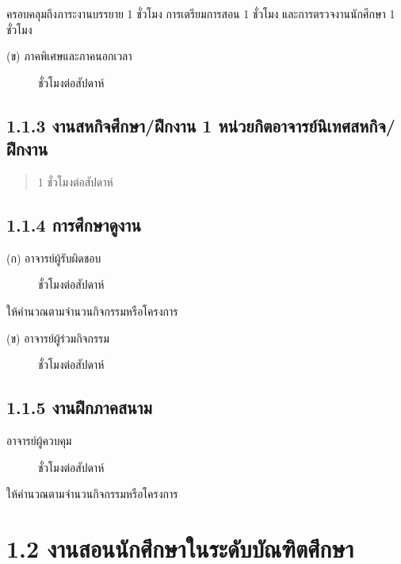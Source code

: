\documentclass[a4paper,12pt,english]{sphinxmanual}
\begin{document}
ครอบคลุมถึงภาระงานบรรยาย 1 ชั่วโมง การเตรียมการสอน 1 ชั่วโมง และการตรวจงานนักศึกษา 1 ชั่วโมง
\begin{description}
\item[{(ข) ภาคพิเศษและภาคนอกเวลา}]  ชั่วโมงต่อสัปดาห์

\end{description}


\subsection{1.1.3 งานสหกิจศึกษา/ฝึกงาน 1 หน่วยกิตอาจารย์นิเทศสหกิจ/ฝึกงาน}
\label{\detokenize{1teaching:id5}}\begin{quote}

1 ชั่วโมงต่อสัปดาห์
\end{quote}


\subsection{1.1.4 การศึกษาดูงาน}
\label{\detokenize{1teaching:id6}}\begin{description}
\item[{(ก) อาจารย์ผู้รับผิดชอบ}]  ชั่วโมงต่อสัปดาห์

\end{description}

ให้คำนวณตามจำนวนกิจกรรมหรือโครงการ
\begin{description}
\item[{(ข) อาจารย์ผู้ร่วมกิจกรรม}]  ชั่วโมงต่อสัปดาห์

\end{description}


\subsection{1.1.5 งานฝึกภาคสนาม}
\label{\detokenize{1teaching:id7}}\begin{description}
\item[{อาจารย์ผู้ควบคุม}]  ชั่วโมงต่อสัปดาห์

\end{description}

ให้คำนวณตามจำนวนกิจกรรมหรือโครงการ


\section{1.2 งานสอนนักศึกษาในระดับบัณฑิตศึกษา}
\label{\detokenize{1teaching:id8}}
\end{document}
